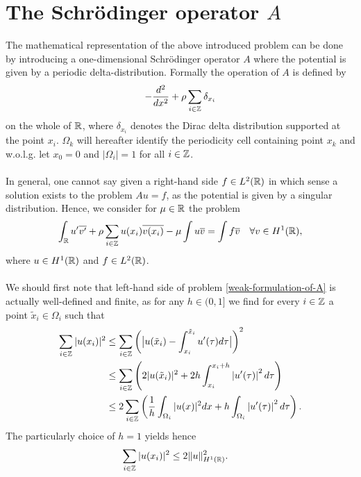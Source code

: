 \chapter{\texorpdfstring{The Schrödinger operator $A$}{The Schrödinger operator A}}

The mathematical representation of the above introduced problem can be done by introducing a one-dimensional Schrödinger operator $A$ where the potential is given by a periodic delta-distribution. Formally the operation of $A$ is defined by
\begin{equation}
	- \frac{d^{2}}{dx^{2}} + \rho \sum_{i \in \mathbb{Z}} \delta_{x_{i}} \label{the-operator-A-formally}
\end{equation}
on the whole of $\mathbb{R}$, where $\delta_{x_{i}}$ denotes the Dirac delta distribution supported at the point $x_{i}$. $\Omega_{k}$ will hereafter identify the periodicity cell containing point $x_{k}$ and w.o.l.g. let $x_{0} = 0$ and $|\Omega_{i}| = 1$ for all $i \in \mathbb{Z}$.
~\\ ~\\  
In general, one cannot say given a right-hand side $f \in L^{2}(\mathbb{R})$ in which sense a solution exists to the problem $Au = f$, as the potential is given by a singular distribution. Hence, we consider for $\mu \in \mathbb{R}$ the problem
\begin{equation}
	\int_{\mathbb{R}} u' \overline{v'} + \rho \sum_{i \in \mathbb{Z}} u(x_{i}) \overline{v(x_{i})} - \mu \int u \overline{v} = \int f \overline{v} \quad \forall v \in H^{1}(\mathbb{R}), \label{weak-formulation-of-A}
\end{equation}	
where $u \in H^{1}(\mathbb{R})$ and $f \in L^{2}(\mathbb{R})$. 
~\\ ~\\
We should first note that left-hand side of problem \eqref{weak-formulation-of-A} is actually well-defined and finite, as for any $h \in (0, 1]$ we find for every $i \in \mathbb{Z}$ a point $\tilde{x}_{i} \in \Omega_{i}$ such that
\begin{align}
	\sum_{i \in \mathbb{Z}} |u(x_{i})|^{2} & \leq \sum_{i \in \mathbb{Z}} \left( \big| u(\tilde{x}_{i}) - \int_{x_{i}}^{\tilde{x}_{i}} u'( \tau ) d\tau \big| \right)^{2} \notag \\
		 & \leq \sum_{i \in \mathbb{Z}} \left( 2 |u( \tilde{x}_{i} )|^{2} +  2 h \int_{x_{i}}^{x_{i} + h} \left| u'(\tau) \right|^{2} d\tau \right) \notag \\
		 & \leq 2 \sum_{i \in \mathbb{Z}} \left( \frac{1}{h} \int_{\Omega_{i}} |u( x )|^{2} dx + h \int_{\Omega_{i}} \left| u'(\tau) \right|^{2} d\tau \right). \label{preestimation-for-potential}
\end{align}
The particularly choice of $h = 1$ yields hence
\begin{align} 
		\sum_{i \in \mathbb{Z}} |u(x_{i})|^{2} & \leq 2 \| u \|^{2}_{H^{1}(\mathbb{R})}. \label{estimation-for-potential}
\end{align}

